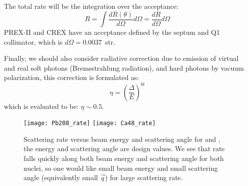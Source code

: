 The total rate will be the integration over the acceptance:
\begin{equation}
    R = \int \frac{dR(\theta)}{d\Omega} d\Omega = \frac{dR}{d\Omega} d\Omega
\end{equation}
PREX-II and CREX have an acceptance defined by the septum and Q1 collimator, which
is $d\Omega = 0.0037$~str.

Finally, we should also consider radiative correction due to emission of virtual
and real soft photons (Bremsstrahlung radiation), and hard photons by vacuum polarization,
this correction is formulated as:
\begin{equation}
    \eta = \left(\frac{\Delta}{E} \right)^{bt}
\end{equation}
which is evaluated to be: $\eta \sim 0.5$.

\begin{figure}[h!]
    \texttt{[image: Pb208\_rate]}
    \texttt{[image: Ca48\_rate]}
    \caption{Scattering rate versus beam energy and scattering angle for \Pb and \Ca,
    the energy and scattering angle are design values.
    We see that rate falls quickly along both beam energy and scattering angle for
    both nuclei, so one would like small beam energy and small scattering angle (equivalently
    small $\vec{q}$) for large scattering rate.}
\end{figure}

